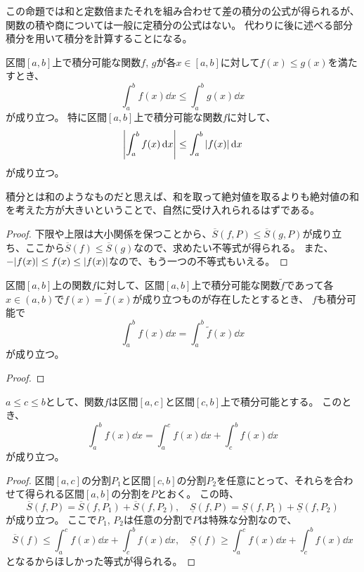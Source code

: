 この命題では和と定数倍またそれを組み合わせて差の積分の公式が得られるが、関数の積や商については一般に定積分の公式はない。
代わりに後に述べる部分積分を用いて積分を計算することになる。

\begin{proposition}[積分の大小関係]
区間$[a, b]$上で積分可能な関数$f$, $g$が各$x \in [a, b]$に対して$f(x) \le g(x)$を満たすとき、
$$
\int_a^b f(x)\dd{x} \le \int_a^b g(x)\dd{x}
$$
が成り立つ。
特に区間$[a, b]$上で積分可能な関数$f$に対して、
$$
\abs{\int_a^b f(x)\dd{x}} \le \int_a^b \abs{f(x)}\dd{x}
$$
が成り立つ。
\end{proposition}

積分とは和のようなものだと思えば、和を取って絶対値を取るよりも絶対値の和を考えた方が大きいということで、自然に受け入れられるはずである。

\begin{proof}
下限や上限は大小関係を保つことから、$\overline{S}(f, P) \le \overline{S}(g, P)$が成り立ち、ここから$\overline{S}(f) \le \overline{S}(g)$なので、求めたい不等式が得られる。
また、$-\abs{f(x)} \le f(x) \le \abs{f(x)}$なので、もう一つの不等式もいえる。
\end{proof}

\begin{proposition}[積分の端点修正]
区間$[a, b]$上の関数$f$に対して、区間$[a, b]$上で積分可能な関数$\tilde{f}$であって各$x \in (a, b)$で$f(x) = \tilde{f}(x)$が成り立つものが存在したとするとき、
$f$も積分可能で
$$
\int_a^b f(x)\dd{x} = \int_a^b \tilde{f}(x)\dd{x}
$$
が成り立つ。
\end{proposition}

\begin{proof}
\end{proof}

\begin{proposition}[積分の区間]
\label{t_int_interval}
$a \le c \le b$として、関数$f$は区間$[a, c]$と区間$[c, b]$上で積分可能とする。
このとき、
$$
\int_a^b f(x)\dd{x} = \int_a^c f(x)\dd{x}+\int_c^b f(x)\dd{x}
$$
が成り立つ。
\end{proposition}

\begin{proof}
区間$[a, c]$の分割$P_1$と区間$[c, b]$の分割$P_2$を任意にとって、それらを合わせて得られる区間$[a, b]$の分割を$P$とおく。
この時、
$$
\overline{S}(f, P) = \overline{S}(f, P_1)+\overline{S}(f, P_2),
\quad \underline{S}(f, P) = \underline{S}(f, P_1)+\underline{S}(f, P_2)
$$
が成り立つ。
ここで$P_1$, $P_2$は任意の分割で$P$は特殊な分割なので、
$$
\overline{S}(f) \le \int_a^c f(x)\dd{x}+\int_c^b f(x)\dd{x},
\quad \underline{S}(f) \ge \int_a^c f(x)\dd{x}+\int_c^b f(x)\dd{x}
$$
となるからほしかった等式が得られる。
\end{proof}

